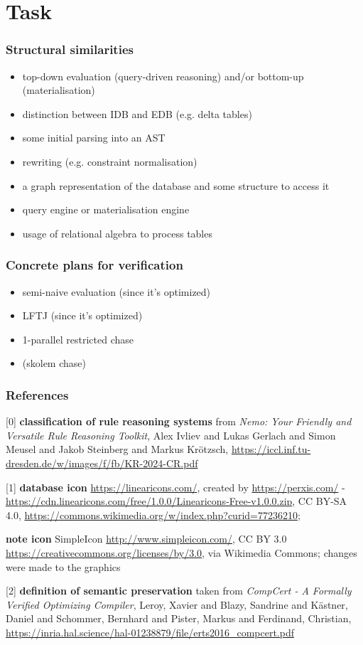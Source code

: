\documentclass[aspectratio=169]{beamer}
\begin{document}
\section{Task}

\begin{frame}
	\frametitle{Structural similarities}
		\begin{itemize}
			\item top-down evaluation (query-driven reasoning) and/or bottom-up (materialisation)
			\item distinction between IDB and EDB (e.g. delta tables)
			\item some initial parsing into an AST
			\item rewriting (e.g. constraint normalisation)
			\item a graph representation of the database and some structure to access it
			\item query engine or materialisation engine
			\item usage of relational algebra to process tables
		\end{itemize}
\end{frame}

\begin{frame}
	\frametitle{Concrete plans for verification}
	\begin{itemize}
		\item semi-naive evaluation (since it's optimized)
		\item LFTJ (since it's optimized)
		\item 1-parallel restricted chase
		\item (skolem chase)
	\end{itemize}
\end{frame}

\begin{frame}
	\frametitle{References}
	\tiny{
	[0] \textbf{classification of rule reasoning systems} from \textit{Nemo: Your Friendly and Versatile Rule Reasoning Toolkit}, Alex Ivliev and Lukas Gerlach and Simon Meusel and Jakob Steinberg and Markus Krötzsch, \url{https://iccl.inf.tu-dresden.de/w/images/f/fb/KR-2024-CR.pdf}
	
	[1] \textbf{database icon} \url{https://linearicons.com/}, created by \url{https://perxis.com/} - \url{https://cdn.linearicons.com/free/1.0.0/Linearicons-Free-v1.0.0.zip}, CC BY-SA 4.0, \url{https://commons.wikimedia.org/w/index.php?curid=77236210};
	
	\textbf{note icon} SimpleIcon \url{http://www.simpleicon.com/}, CC BY 3.0 \url{https://creativecommons.org/licenses/by/3.0}, via Wikimedia Commons; changes were made to the graphics
	
	[2] \textbf{definition of semantic preservation} taken from \textit{CompCert - A Formally Verified Optimizing Compiler}, Leroy, Xavier and Blazy, Sandrine and Kästner, Daniel and Schommer, Bernhard and Pister, Markus and Ferdinand, Christian, \url{https://inria.hal.science/hal-01238879/file/erts2016_compcert.pdf}}
  
\end{frame}


	
\end{document}

